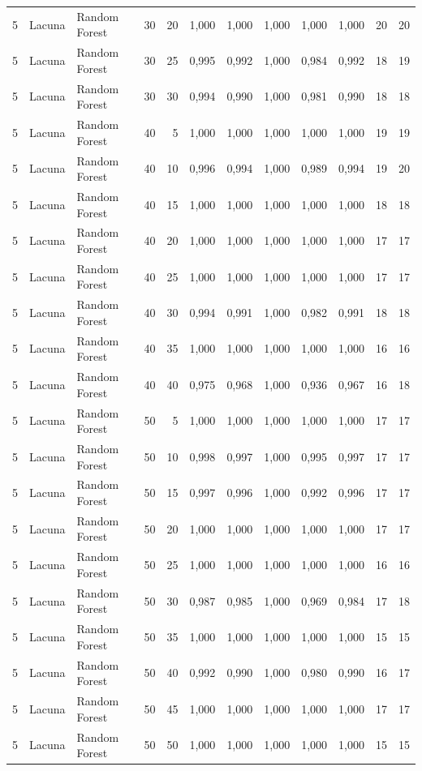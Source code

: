 \begin{longtable}{@{}rllrrrrrrrrr@{}}
5 & Lacuna & Random Forest & 30 & 20 & 1,000 & 1,000 & 1,000 & 1,000 & 1,000 & 20 & 20 \\
5 & Lacuna & Random Forest & 30 & 25 & 0,995 & 0,992 & 1,000 & 0,984 & 0,992 & 18 & 19 \\
5 & Lacuna & Random Forest & 30 & 30 & 0,994 & 0,990 & 1,000 & 0,981 & 0,990 & 18 & 18 \\
5 & Lacuna & Random Forest & 40 & 5 & 1,000 & 1,000 & 1,000 & 1,000 & 1,000 & 19 & 19 \\
5 & Lacuna & Random Forest & 40 & 10 & 0,996 & 0,994 & 1,000 & 0,989 & 0,994 & 19 & 20 \\
5 & Lacuna & Random Forest & 40 & 15 & 1,000 & 1,000 & 1,000 & 1,000 & 1,000 & 18 & 18 \\
5 & Lacuna & Random Forest & 40 & 20 & 1,000 & 1,000 & 1,000 & 1,000 & 1,000 & 17 & 17 \\
5 & Lacuna & Random Forest & 40 & 25 & 1,000 & 1,000 & 1,000 & 1,000 & 1,000 & 17 & 17 \\
5 & Lacuna & Random Forest & 40 & 30 & 0,994 & 0,991 & 1,000 & 0,982 & 0,991 & 18 & 18 \\
5 & Lacuna & Random Forest & 40 & 35 & 1,000 & 1,000 & 1,000 & 1,000 & 1,000 & 16 & 16 \\
5 & Lacuna & Random Forest & 40 & 40 & 0,975 & 0,968 & 1,000 & 0,936 & 0,967 & 16 & 18 \\
5 & Lacuna & Random Forest & 50 & 5 & 1,000 & 1,000 & 1,000 & 1,000 & 1,000 & 17 & 17 \\
5 & Lacuna & Random Forest & 50 & 10 & 0,998 & 0,997 & 1,000 & 0,995 & 0,997 & 17 & 17 \\
5 & Lacuna & Random Forest & 50 & 15 & 0,997 & 0,996 & 1,000 & 0,992 & 0,996 & 17 & 17 \\
5 & Lacuna & Random Forest & 50 & 20 & 1,000 & 1,000 & 1,000 & 1,000 & 1,000 & 17 & 17 \\
5 & Lacuna & Random Forest & 50 & 25 & 1,000 & 1,000 & 1,000 & 1,000 & 1,000 & 16 & 16 \\
5 & Lacuna & Random Forest & 50 & 30 & 0,987 & 0,985 & 1,000 & 0,969 & 0,984 & 17 & 18 \\
5 & Lacuna & Random Forest & 50 & 35 & 1,000 & 1,000 & 1,000 & 1,000 & 1,000 & 15 & 15 \\
5 & Lacuna & Random Forest & 50 & 40 & 0,992 & 0,990 & 1,000 & 0,980 & 0,990 & 16 & 17 \\
5 & Lacuna & Random Forest & 50 & 45 & 1,000 & 1,000 & 1,000 & 1,000 & 1,000 & 17 & 17 \\
5 & Lacuna & Random Forest & 50 & 50 & 1,000 & 1,000 & 1,000 & 1,000 & 1,000 & 15 & 15 \\

\end{longtable}
